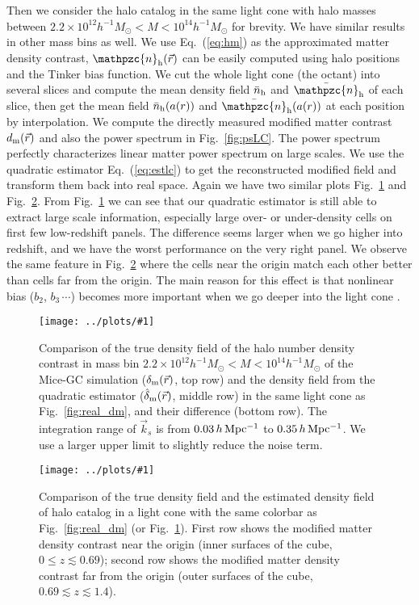 \documentclass[prd,amsmath,amssymb,floatfix,superscriptaddress,nofootinbib,twocolumn]{revtex4-1}
\newcommand{\vrr}{\vec{r}}
\newcommand{\vk}{\vec{k}}
\newcommand{\ec}[1]{Eq.~(\ref{eq:#1})}
\newcommand{\rf}[1]{\ref{fig:#1}}
\newcommand{\sfig}[2]{
\texttt{[image: ../plots/\#1]}
        }
\newcommand{\Sfig}[2]{
   \begin{figure}[thbp]
   \begin{center}
    \sfig{../plots/#1.pdf}{\columnwidth}
    \caption{{\small #2}}
    \label{fig:#1}
     \end{center}
   \end{figure}
}
\begin{document}
Then we consider the halo catalog in the same light cone with halo masses between $2.2 \times 10^{12}h^{-1}M_{\odot}<M < 10^{14}h^{-1}M_{\odot}$ for brevity. We have similar results in other mass bins as well. We use \ec{hm} as the approximated matter density contrast, $\mathpzc{n}_{\rm h}(\vrr)$ can be easily computed using halo positions and the Tinker bias function. We cut the whole light cone (the octant) into several slices and compute the mean density field $\bar{{n}}_{\rm h}$ and $\bar{\mathpzc{n}}_{\rm h}$ of each slice, then get the mean field  $\bar{{n}}_{\rm h}(a(r))$ and $\bar{\mathpzc{n}}_{\rm h}(a(r))$ at each position by interpolation. We compute the directly measured modified matter contrast $d_{\rm m}(\vrr)$ and also the power spectrum in Fig.~\rf{psLC}. The power spectrum perfectly characterizes linear matter power spectrum on large scales. We use the quadratic estimator \ec{estlc} to get the reconstructed modified field and transform them back into real space. Again we have two similar plots Fig.~\rf{real_halo} and Fig.~\rf{cube_halo}. From Fig.~\rf{real_halo} we can see that our quadratic estimator is still able to extract large scale information, especially large over- or under-density cells on first few low-redshift panels. The difference seems larger when we go higher into redshift, and we have the worst performance on the very right panel. We observe the same feature in Fig.~\rf{cube_halo} where the cells near the origin match each other better than cells far from the origin. The main reason for this effect is that nonlinear bias ($b_{2}$, $b_{3}\,\cdots$) becomes more important when we go deeper into the light cone \cite{Lazeyras:2016nbs}.

\Sfig{real_halo}{Comparison of the true density field of the halo number density contrast in mass bin $2.2 \times 10^{12}h^{-1}M_{\odot}<M < 10^{14}h^{-1}M_{\odot}$ of the Mice-GC simulation ($\delta_{\rm m}(\vrr)$, top row) and the density field from the quadratic estimator ($\hat{\delta}_{\rm m}(\vrr)$, middle row) in the same light cone as Fig.~\rf{real_dm}, and their difference (bottom row). The integration range of $\vk_{s}$ is from $0.03\, h \rm \, Mpc^{-1}$ to $0.35\, h \rm \, Mpc^{-1}$. We use a larger upper limit to slightly reduce the noise term.} 
\Sfig{cube_halo}{Comparison of the true density field and the estimated density field of halo catalog in a light cone with the same colorbar as Fig.~\rf{real_dm} (or Fig.~\rf{real_halo}). First row shows the modified matter density contrast near the origin (inner surfaces of the cube, $0\leqslant z \lesssim 0.69$); second row shows the modified matter density contrast far from the origin (outer surfaces of the cube, $0.69\lesssim z \lesssim 1.4$).}
\end{document}
